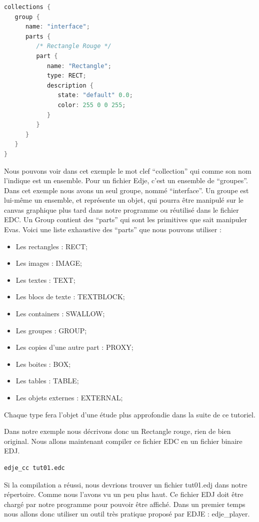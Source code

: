 \documentclass[a4paper]{efr}
\begin{document}
\begin{lstlisting}[language=c]
 collections {
   group {
      name: "interface";
      parts {
         /* Rectangle Rouge */
         part {
            name: "Rectangle";
            type: RECT;
            description {
               state: "default" 0.0;
               color: 255 0 0 255;
            }
         }
      }
   }
}
\end{lstlisting}

Nous pouvons voir dans cet exemple le mot clef ``collection'' qui comme son
nom l'indique est un ensemble. Pour un fichier Edje, c'est un ensemble
de ``groupes''.
Dans cet exemple nous avons un seul groupe, nommé ``interface''.
Un groupe est lui-même un ensemble, et représente un objet, qui pourra être
manipulé sur le canvas graphique plus tard dans notre programme ou réutilisé
dans le fichier EDC.
Un Group contient des ``parts'' qui sont les primitives que sait manipuler Evas.
Voici une liste exhaustive des ``parts'' que nous pouvons utiliser :
\begin{itemize}
\item Les rectangles : RECT;
\item Les images : IMAGE;
\item Les textes : TEXT;
\item Les blocs de texte : TEXTBLOCK;
\item Les containers : SWALLOW;
\item Les groupes : GROUP;
\item Les copies d'une autre part : PROXY;
\item Les boites : BOX;
\item Les tables : TABLE;
\item Les objets externes : EXTERNAL;
\end{itemize}

Chaque type fera l'objet d'une étude plus approfondie dans la suite de ce
tutoriel.

Dans notre exemple nous décrivons donc un Rectangle rouge, rien de bien
original. Nous allons maintenant compiler ce fichier EDC en un fichier binaire
EDJ.

\begin{lstlisting}
edje_cc tut01.edc
\end{lstlisting}

Si la compilation a réussi, nous devrions trouver un fichier tut01.edj dans notre
répertoire. Comme nous l'avons vu un peu plus haut. Ce fichier EDJ doit être
chargé par notre programme pour pouvoir être affiché. Dans un premier temps nous
allons donc utiliser un outil très pratique proposé par EDJE : edje\_player.
\end{document}
